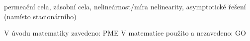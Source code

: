permeační cela, zásobní cela, nelineárnost/míra nelinearity, asymptotické řešení (namísto stacionárního)

V úvodu matematiky zavedeno: PME
V matematice použito a nezavedeno: GO

